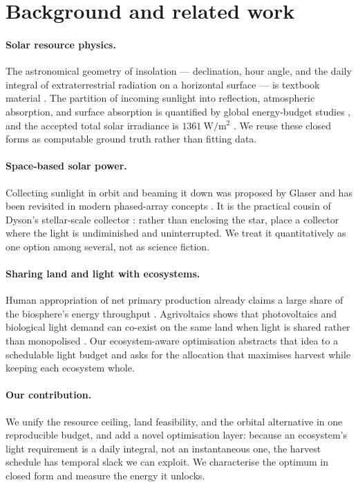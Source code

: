 \section{Background and related work}

\paragraph{Solar resource physics.} The astronomical geometry of insolation ---
declination, hour angle, and the daily integral of extraterrestrial radiation
on a horizontal surface --- is textbook material \cite{duffie2013solar}. The
partition of incoming sunlight into reflection, atmospheric absorption, and
surface absorption is quantified by global energy-budget studies
\cite{trenberth2009earth}, and the accepted total solar irradiance is
$1361~\mathrm{W/m^2}$ \cite{kopp2011total}. We reuse these closed forms as
computable ground truth rather than fitting data.

\paragraph{Space-based solar power.} Collecting sunlight in orbit and beaming
it down was proposed by Glaser \cite{glaser1968power} and has been revisited in
modern phased-array concepts \cite{mankins2014sps}. It is the practical cousin
of Dyson's stellar-scale collector \cite{dyson1960search}: rather than
enclosing the star, place a collector where the light is undiminished and
uninterrupted. We treat it quantitatively as one option among several, not as
science fiction.

\paragraph{Sharing land and light with ecosystems.} Human appropriation of net
primary production already claims a large share of the biosphere's energy
throughput \cite{haberl2007quantifying}. Agrivoltaics shows that photovoltaics
and biological light demand can co-exist on the same land when light is shared
rather than monopolised \cite{barron2019agrivoltaics}. Our ecosystem-aware
optimisation abstracts that idea to a schedulable light budget and asks for the
allocation that maximises harvest while keeping each ecosystem whole.

\paragraph{Our contribution.} We unify the resource ceiling, land feasibility,
and the orbital alternative in one reproducible budget, and add a novel
optimisation layer: because an ecosystem's light requirement is a daily
integral, not an instantaneous one, the harvest schedule has temporal slack we
can exploit. We characterise the optimum in closed form and measure the energy
it unlocks.
